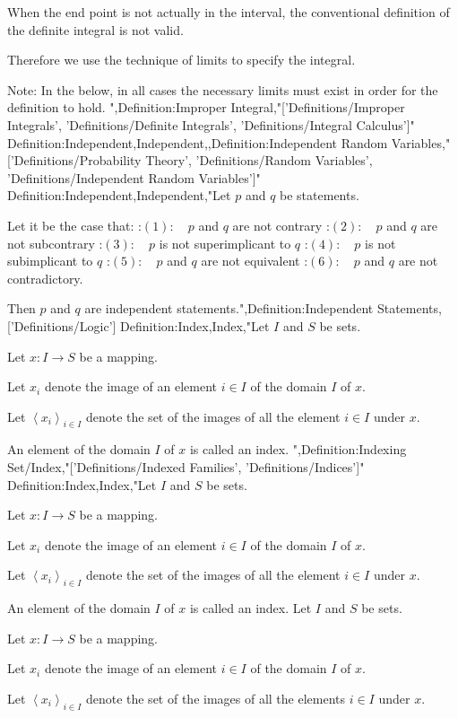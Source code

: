 When the end point is not actually in the interval, the conventional definition of the definite integral is not valid.

Therefore we use the technique of limits to specify the integral.


Note: In the below, in all cases the necessary limits must exist in order for the definition to hold.
",Definition:Improper Integral,"['Definitions/Improper Integrals', 'Definitions/Definite Integrals', 'Definitions/Integral Calculus']"
Definition:Independent,Independent,,Definition:Independent Random Variables,"['Definitions/Probability Theory', 'Definitions/Random Variables', 'Definitions/Independent Random Variables']"
Definition:Independent,Independent,"Let $p$ and $q$ be statements.

Let it be the case that:
:$(1): \quad p$ and $q$ are not contrary
:$(2): \quad p$ and $q$ are not subcontrary
:$(3): \quad p$ is not superimplicant to $q$
:$(4): \quad p$ is not subimplicant to $q$
:$(5): \quad p$ and $q$ are not equivalent
:$(6): \quad p$ and $q$ are not contradictory.


Then $p$ and $q$ are independent statements.",Definition:Independent Statements,['Definitions/Logic']
Definition:Index,Index,"Let $I$ and $S$ be sets.

Let $x: I \to S$ be a mapping.

Let $x_i$ denote the image of an element $i \in I$ of the domain $I$ of $x$.

Let $\left\langle x_i \right\rangle_{i \mathop \in I}$ denote the set of the images of all the element $i \in I$ under $x$.


An element of the domain $I$ of $x$ is called an index.
",Definition:Indexing Set/Index,"['Definitions/Indexed Families', 'Definitions/Indices']"
Definition:Index,Index,"Let $I$ and $S$ be sets.

Let $x: I \to S$ be a mapping.

Let $x_i$ denote the image of an element $i \in I$ of the domain $I$ of $x$.

Let $\left\langle x_i \right\rangle_{i \mathop \in I}$ denote the set of the images of all the element $i \in I$ under $x$.


An element of the domain $I$ of $x$ is called an index.
Let $I$ and $S$ be sets.

Let $x: I \to S$ be a mapping.

Let $x_i$ denote the image of an element $i \in I$ of the domain $I$ of $x$.

Let $\left\langle x_i \right\rangle_{i \mathop \in I}$ denote the set of the images of all the elements $i \in I$ under $x$.



